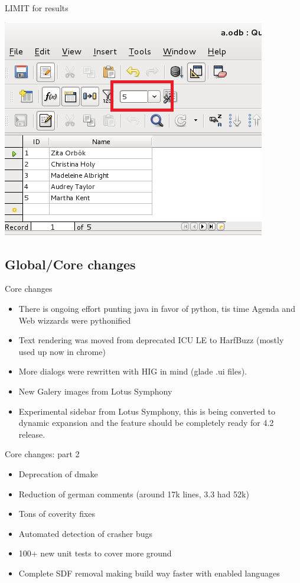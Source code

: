 \documentclass{beamer}
\begin{document}
\begin{frame}{LIMIT for results}
	\begin{center}
	\includegraphics[width= 0.7\linewidth]{limit-base.png}
	\end{center}
\end{frame}

\subsection{Global/Core changes}

\begin{frame}[t]{Core changes}
	\begin{itemize}
	\item There is ongoing effort punting java in favor of python, tis time Agenda and Web wizzards were pythonified
	\item Text rendering was moved from deprecated ICU LE to HarfBuzz (mostly used up now in chrome)
	\item More dialogs were rewritten with HIG in mind (glade .ui files).
	\item New Galery images from Lotus Symphony
	\item Experimental sidebar from Lotus Symphony, this is being converted to dynamic expansion and the feature should be completely ready for 4.2 release.
	\end{itemize}
\end{frame}

\begin{frame}[t]{Core changes: part 2}
	\begin{itemize}
	\item Deprecation of dmake
	\item Reduction of german comments (around 17k lines, 3.3 had 52k)
	\item Tons of coverity fixes
	\item Automated detection of crasher bugs
	\item 100+ new unit tests to cover more ground
	\item Complete SDF removal making build way faster with enabled languages
	\end{itemize}
\end{frame}
\end{document}
